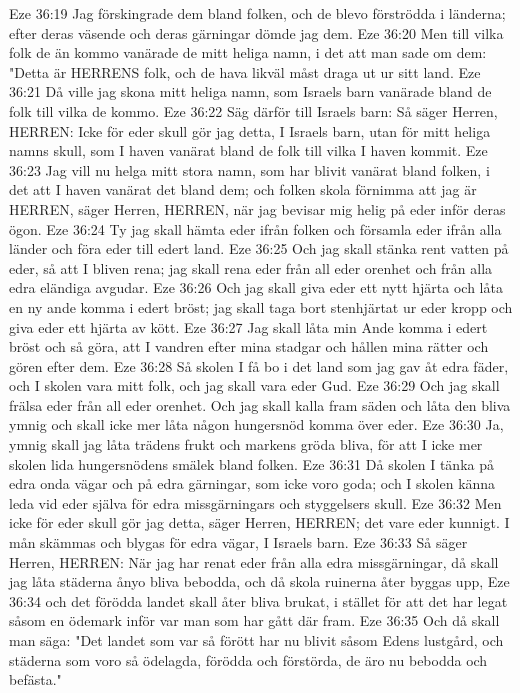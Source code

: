 Eze 36:19  Jag förskingrade dem bland folken, och de blevo förströdda i länderna; efter deras väsende och deras gärningar dömde jag dem.
Eze 36:20  Men till vilka folk de än kommo vanärade de mitt heliga namn, i det att man sade om dem: "Detta är HERRENS folk, och de hava likväl måst draga ut ur sitt land.
Eze 36:21  Då ville jag skona mitt heliga namn, som Israels barn vanärade bland de folk till vilka de kommo.
Eze 36:22  Säg därför till Israels barn: Så säger Herren, HERREN: Icke för eder skull gör jag detta, I Israels barn, utan för mitt heliga namns skull, som I haven vanärat bland de folk till vilka I haven kommit.
Eze 36:23  Jag vill nu helga mitt stora namn, som har blivit vanärat bland folken, i det att I haven vanärat det bland dem; och folken skola förnimma att jag är HERREN, säger Herren, HERREN, när jag bevisar mig helig på eder inför deras ögon.
Eze 36:24  Ty jag skall hämta eder ifrån folken och församla eder ifrån alla länder och föra eder till edert land.
Eze 36:25  Och jag skall stänka rent vatten på eder, så att I bliven rena; jag skall rena eder från all eder orenhet och från alla edra eländiga avgudar.
Eze 36:26  Och jag skall giva eder ett nytt hjärta och låta en ny ande komma i edert bröst; jag skall taga bort stenhjärtat ur eder kropp och giva eder ett hjärta av kött.
Eze 36:27  Jag skall låta min Ande komma i edert bröst och så göra, att I vandren efter mina stadgar och hållen mina rätter och gören efter dem.
Eze 36:28  Så skolen I få bo i det land som jag gav åt edra fäder, och I skolen vara mitt folk, och jag skall vara eder Gud.
Eze 36:29  Och jag skall frälsa eder från all eder orenhet. Och jag skall kalla fram säden och låta den bliva ymnig och skall icke mer låta någon hungersnöd komma över eder.
Eze 36:30  Ja, ymnig skall jag låta trädens frukt och markens gröda bliva, för att I icke mer skolen lida hungersnödens smälek bland folken.
Eze 36:31  Då skolen I tänka på edra onda vägar och på edra gärningar, som icke voro goda; och I skolen känna leda vid eder själva för edra missgärningars och styggelsers skull.
Eze 36:32  Men icke för eder skull gör jag detta, säger Herren, HERREN; det vare eder kunnigt. I mån skämmas och blygas för edra vägar, I Israels barn.
Eze 36:33  Så säger Herren, HERREN: När jag har renat eder från alla edra missgärningar, då skall jag låta städerna ånyo bliva bebodda, och då skola ruinerna åter byggas upp,
Eze 36:34  och det förödda landet skall åter bliva brukat, i stället för att det har legat såsom en ödemark inför var man som har gått där fram.
Eze 36:35  Och då skall man säga: "Det landet som var så förött har nu blivit såsom Edens lustgård, och städerna som voro så ödelagda, förödda och förstörda, de äro nu bebodda och befästa."
